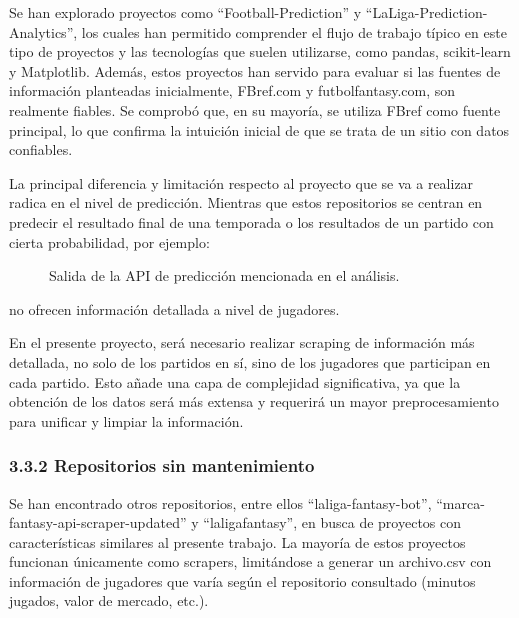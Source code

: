 Se han explorado proyectos como ``Football-Prediction'' y ``LaLiga-Prediction-Analytics'', los 
cuales han permitido comprender el flujo de trabajo típico en este tipo de proyectos y las 
tecnologías que suelen utilizarse, como pandas, scikit-learn y Matplotlib. Además, estos proyectos 
han servido para evaluar si las fuentes de información planteadas inicialmente, FBref.com y 
futbolfantasy.com, son realmente fiables. Se comprobó que, en su mayoría, se utiliza FBref como 
fuente principal, lo que confirma la intuición inicial de que se trata de un sitio con datos 
confiables.

La principal diferencia y limitación respecto al proyecto que se va a realizar radica en el nivel de 
predicción. Mientras que estos repositorios se centran en predecir el resultado final de una 
temporada o los resultados de un partido con cierta probabilidad, por ejemplo:

\begin{figure}[H]
\centering
{}
\caption{Salida de la API de predicción mencionada en el análisis.}
\end{figure}

no ofrecen información detallada a nivel de jugadores.

En el presente proyecto, será necesario realizar scraping de información más detallada, no solo de 
los partidos en sí, sino de los jugadores que participan en cada partido. Esto añade una capa de 
complejidad significativa, ya que la obtención de los datos será más extensa y requerirá un mayor 
preprocesamiento para unificar y limpiar la información.

\subsubsection{3.3.2 Repositorios sin mantenimiento}

Se han encontrado otros repositorios, entre ellos ``laliga-fantasy-bot'', 
``marca-fantasy-api-scraper-updated'' y ``laligafantasy'', en busca de proyectos con 
características similares al presente trabajo. La mayoría de estos proyectos funcionan únicamente 
como scrapers, limitándose a generar un archivo.csv con información de jugadores que varía según el 
repositorio consultado (minutos jugados, valor de mercado, etc.).

